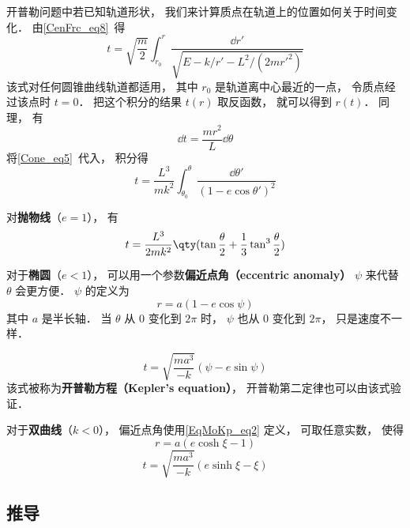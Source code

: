 

开普勒问题中若已知轨道形状， 我们来计算质点在轨道上的位置如何关于时间变化． 由\autoref{CenFrc_eq8}~得
\begin{equation}
t = \sqrt{\frac{m}{2}} \int_{r_0}^r \frac{\dd{r'}}{\sqrt{E - k/r' - L^2/(2mr'^2)}}
\end{equation}
该式对任何圆锥曲线轨道都适用， 其中 $r_0$ 是轨道离中心最近的一点， 令质点经过该点时 $t= 0$． 把这个积分的结果 $t(r)$ 取反函数， 就可以得到 $r(t)$． 同理， 有
\begin{equation}
\dd{t} = \frac{mr^2}{L}\dd{\theta}
\end{equation}
将\autoref{Cone_eq5}~代入， 积分得
\begin{equation}
t = \frac{L^3}{mk^2} \int_{\theta_0}^\theta \frac{\dd{\theta'}}{(1 - e\cos \theta')^2 }
\end{equation}

对\textbf{抛物线}（$e = 1$）， 有
\begin{equation}\label{EqMoKp_eq3}
t = \frac{L^3}{2mk^2} \qty(\tan\frac{\theta}{2} +  \frac{1}{3}\tan^3 \frac{\theta}{2})
\end{equation}

对于\textbf{椭圆}（$e < 1$）， 可以用一个参数\textbf{偏近点角（eccentric anomaly）} $\psi$ 来代替 $\theta$ 会更方便． $\psi$ 的定义为
\begin{equation}\label{EqMoKp_eq1}
r = a(1-e\cos\psi)
\end{equation}
其中 $a$ 是半长轴． 当 $\theta$ 从 $0$ 变化到 $2\pi$ 时， $\psi$ 也从 $0$ 变化到 $2\pi$， 只是速度不一样．

\begin{equation}
t = \sqrt{\frac{ma^3}{-k}} (\psi - e \sin\psi)
\end{equation}
该式被称为\textbf{开普勒方程（Kepler's equation）}， 开普勒第二定律也可以由该式验证．

对于\textbf{双曲线}（$k<0$）， 偏近点角使用\autoref{EqMoKp_eq2} 定义， 可取任意实数， 使得
\begin{equation}\label{EqMoKp_eq2} %
r = a(e\cosh\xi - 1)
\end{equation}
\begin{equation}
t = \sqrt{\frac{ma^3}{-k}} (e\sinh\xi - \xi)
\end{equation}



\subsection{推导}
